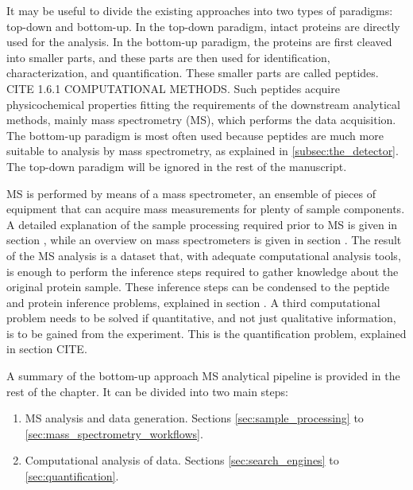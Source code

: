 \documentclass[11pt, a4paper]{report}
\begin{document}
It may be useful to divide the existing approaches into two types of paradigms: top-down and bottom-up. In the top-down paradigm, intact proteins are directly used for the analysis. In the bottom-up paradigm, the proteins are first cleaved into smaller parts, and these parts are then used for identification, characterization, and quantification. These smaller parts are called peptides. \cite{Barsnes2008} CITE 1.6.1 COMPUTATIONAL METHODS. Such peptides acquire physicochemical properties fitting the requirements of the downstream analytical methods, mainly mass spectrometry (MS), which performs the data acquisition. The bottom-up paradigm is most often used because peptides are much more suitable to analysis by mass spectrometry, as explained in \ref{subsec:the_detector}. The top-down paradigm will be ignored in the rest of the manuscript.



MS is performed by means of a mass spectrometer, an ensemble of pieces of equipment that can acquire mass measurements for plenty of sample components. A detailed explanation of the sample processing required prior to MS is given in section \label{sec:sample processing}, while an overview on mass spectrometers is given in section \label{sec:the mass spectrometer}. The result of the MS analysis is a dataset that, with adequate computational analysis tools, is enough to perform the inference steps required to gather knowledge about the original protein sample. These inference steps can be condensed to the peptide and protein inference problems, explained in section \label{sec:peptide and protein inference}. A third computational problem needs to be solved if quantitative, and not just qualitative information, is to be gained from the experiment. This is the quantification problem, explained in section \label{sec:quantification} CITE.

A summary of the bottom-up approach MS analytical pipeline is provided in the rest of the chapter. It can be divided into two main steps:

\begin{enumerate}

\item \ac{MS} analysis and data generation. Sections \ref{sec:sample_processing} to \ref{sec:mass_spectrometry_workflows}.

\item Computational analysis of data. Sections \ref{sec:search_engines} to \ref{sec:quantification}.

\end{enumerate}
\end{document}
